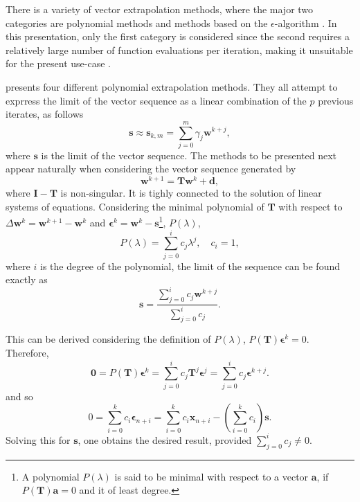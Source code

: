There is a variety of vector extrapolation methods, where the major two categories are polynomial methods and methods based on the \(\epsilon\)-algorithm \citep{brezinski_extrapolation_2013, sidi_vector_2017}.
In this presentation, only the first category is considered since the second requires a relatively large number of function evaluations per iteration, making it unsuitable for the present use-case \citep{sidi_vector_2017}.

\cite{sidi_vector_2017} presents four different polynomial extrapolation methods.
They all attempt to exprress the limit of the vector sequence as a linear combination of the \(p\) previous iterates, as follows
\begin{equation}
\mathbf s \approx \mathbf{s}_{k, m}=\sum_{j=0}^{m} \gamma_{j} \mathbf w^{k+j},
\end{equation}
where \(\mathbf s\) is the limit of the vector sequence.
The methods to be presented next appear naturally when considering the vector sequence generated by
\begin{equation}
  \mathbf w^{k+1} = \mathbf{T}\mathbf w^k +\mathbf d,
\end{equation}
where \(\mathbf I - \mathbf T\) is non-singular.
It is tighly connected to the solution of linear systems of equations.
Considering the minimal polynomial of \(\mathbf T\) with respect to \(\Delta \mathbf w^{k} = \mathbf w^{k+1} -\mathbf w^k\) and \(\boldsymbol \epsilon^k = \mathbf w^k - \mathbf s\)\footnote{A polynomial \(P(\lambda)\) is said to be minimal with respect to a vector \(\mathbf a\), if \(P(\mathbf T) \mathbf a = 0\) and it of least degree.}, \(P(\lambda)\),
\begin{equation}
  P(\lambda ) = \sum_{j=0}^i c_j \lambda^j, \quad c_i=1,
\end{equation}
where \(i\) is the degree of the polynomial, the limit of the sequence can be found exactly as
\begin{equation}
  \mathbf s = \frac{ \sum_{j=0}^i c_j \mathbf w^{k+j}}{ \sum_{j=0}^i c_j}.
\end{equation}

This can be derived considering the definition of \(P(\lambda)\), \(P(\mathbf T) \boldsymbol \epsilon^k=0\).
Therefore,
\begin{equation}
\mathbf 0=P(\mathbf T) \boldsymbol \epsilon^{k}=\sum_{j=0}^{i} c_{j} \mathbf T^{j}  \boldsymbol\epsilon^{j}=\sum_{j=0}^{i} c_{j} \boldsymbol \epsilon^{k+j}.
\end{equation}
and so
\begin{equation}
0=\sum_{i=0}^{k} c_{i} \boldsymbol{\epsilon}_{n+i}=\sum_{i=0}^{k} c_{i} \boldsymbol{x}_{n+i}-\left(\sum_{i=0}^{k} c_{i}\right) \mathbf{s}.
\end{equation}
Solving this for \(\mathbf s\), one obtains the desired result, provided \(\sum_{j=0}^{i} c_{j} \neq 0\).

